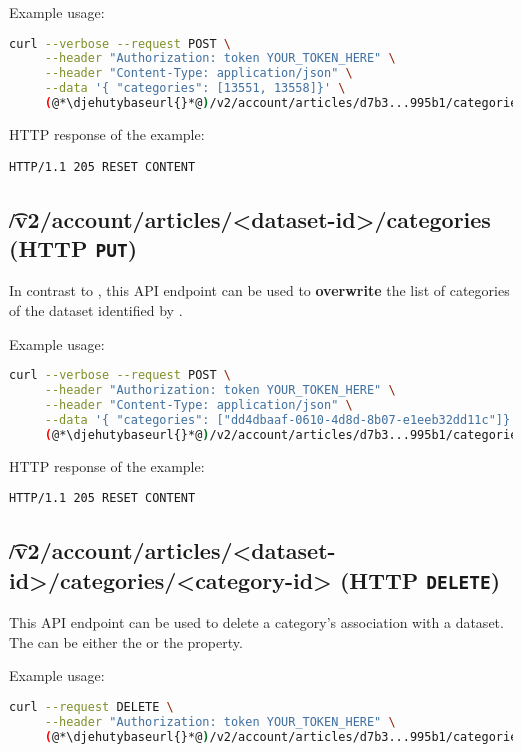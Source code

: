  Example usage:
\begin{lstlisting}[language=bash]
curl --verbose --request POST \
     --header "Authorization: token YOUR_TOKEN_HERE" \
     --header "Content-Type: application/json" \
     --data '{ "categories": [13551, 13558]}' \
     (@*\djehutybaseurl{}*@)/v2/account/articles/d7b3...995b1/categories
\end{lstlisting}

  HTTP response of the example:
\begin{lstlisting}
HTTP/1.1 205 RESET CONTENT
\end{lstlisting}

\subsection{\t{/v2/account/articles/<dataset-id>/categories} (HTTP \texttt{PUT})}

  In contrast to , this API endpoint
  can be used to \textbf{overwrite} the list of categories of the dataset identified
  by \code{dataset-id}.

  Example usage:
\begin{lstlisting}[language=bash]
curl --verbose --request POST \
     --header "Authorization: token YOUR_TOKEN_HERE" \
     --header "Content-Type: application/json" \
     --data '{ "categories": ["dd4dbaaf-0610-4d8d-8b07-e1eeb32dd11c"]}' \
     (@*\djehutybaseurl{}*@)/v2/account/articles/d7b3...995b1/categories
\end{lstlisting}

  HTTP response of the example:
\begin{lstlisting}
HTTP/1.1 205 RESET CONTENT
\end{lstlisting}

\subsection{\t{/v2/account/articles/<dataset-id>/categories/<category-id>} (HTTP \texttt{DELETE})}

  This API endpoint can be used to delete a category's association with a dataset.
  The \code{category-id} can be either the  or the  property.

  Example usage:
\begin{lstlisting}[language=bash]
curl --request DELETE \
     --header "Authorization: token YOUR_TOKEN_HERE" \
     (@*\djehutybaseurl{}*@)/v2/account/articles/d7b3...995b1/categories/5c61...b668
\end{lstlisting}


